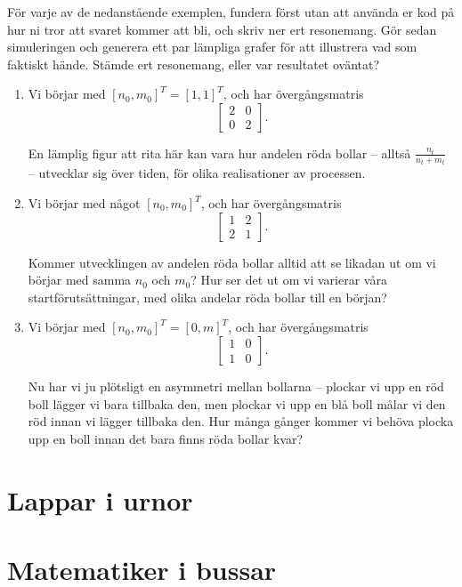 \documentclass[nobib]{tufte-handout}
\begin{document}
\begin{xca}
    För varje av de nedanstående exemplen, fundera först utan att använda er kod på hur ni tror att svaret kommer att bli, och skriv ner ert resonemang. Gör sedan simuleringen och generera ett par lämpliga grafer för att illustrera vad som faktiskt hände. Stämde ert resonemang, eller var resultatet oväntat?

    \begin{enumerate}
        \item Vi börjar med $[n_0, m_0]^T = [1, 1]^T$, och har övergångsmatris
        $$\begin{bmatrix}
            2 & 0 \\
            0 & 2 
        \end{bmatrix}.$$

        En lämplig figur att rita här kan vara hur andelen röda bollar -- alltså $\frac{n_t}{n_t + m_t}$ -- utvecklar sig över tiden, för olika realisationer av processen.

        \item Vi börjar med något $[n_0, m_0]^T$, och har övergångsmatris
        $$\begin{bmatrix}
            1 & 2 \\
            2 & 1 
        \end{bmatrix}.$$

        Kommer utvecklingen av andelen röda bollar alltid att se likadan ut om vi börjar med samma $n_0$ och $m_0$? Hur ser det ut om vi varierar våra startförutsättningar, med olika andelar röda bollar till en början?

        \item Vi börjar med $[n_0, m_0]^T = [0, m]^T$, och har övergångsmatris
        $$\begin{bmatrix}
            1 & 0 \\
            1 & 0 
        \end{bmatrix}.$$

        Nu har vi ju plötsligt en asymmetri mellan bollarna -- plockar vi upp en röd boll lägger vi bara tillbaka den, men plockar vi upp en blå boll målar vi den röd innan vi lägger tillbaka den. Hur många gånger kommer vi behöva plocka upp en boll innan det bara finns röda bollar kvar?
    \end{enumerate}
\end{xca}

\section{Lappar i urnor}

\section{Matematiker i bussar}


%
%
\end{document}
